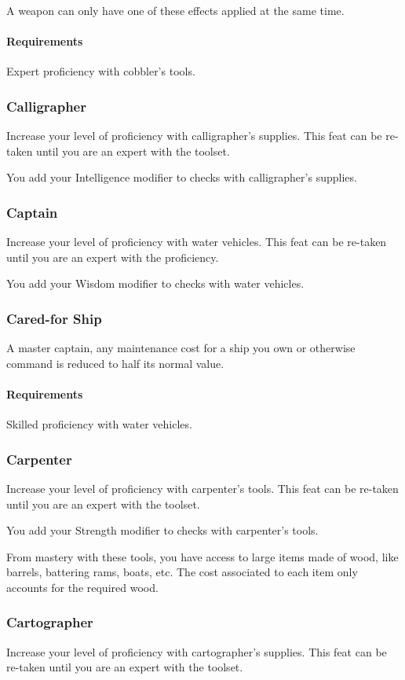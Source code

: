     A weapon can only have one of these effects applied at the same time.
    \paragraph{Requirements} Expert proficiency with cobbler's tools.
\subsubsection{Calligrapher} \label{feat::calligrapher}
    Increase your level of proficiency with calligrapher's supplies.
    This feat can be re-taken until you are an expert with the toolset.

    You add your Intelligence modifier to checks with calligrapher's supplies.
\subsubsection{Captain} \label{feat::captain}
    Increase your level of proficiency with water vehicles.
    This feat can be re-taken until you are an expert with the proficiency.

    You add your Wisdom modifier to checks with water vehicles.
\subsubsection{Cared-for Ship} \label{feat::caredforship}
    A master captain, any maintenance cost for a ship you own or otherwise command is reduced to half its normal value.
    \paragraph{Requirements} Skilled proficiency with water vehicles.
\subsubsection{Carpenter} \label{feat::carpenter}
    Increase your level of proficiency with carpenter's tools.
    This feat can be re-taken until you are an expert with the toolset.

    You add your Strength modifier to checks with carpenter's tools.

    From mastery with these tools, you have access to large items made of wood, like barrels, battering rams, boats, etc.
    The cost associated to each item only accounts for the required wood.
\subsubsection{Cartographer} \label{feat::cartographer}
    Increase your level of proficiency with cartographer's supplies.
    This feat can be re-taken until you are an expert with the toolset.

